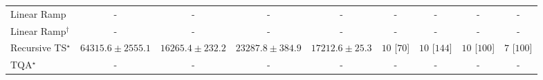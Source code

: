\begin{tabular}{l|cccc|cccc|}
Linear Ramp & {\cellcolor[HTML]{000000}} \color[HTML]{F1F1F1} {\cellcolor{white}} \color{black} - & {\cellcolor[HTML]{000000}} \color[HTML]{F1F1F1} {\cellcolor{white}} \color{black} - & {\cellcolor[HTML]{000000}} \color[HTML]{F1F1F1} {\cellcolor{white}} \color{black} - & {\cellcolor[HTML]{000000}} \color[HTML]{F1F1F1} {\cellcolor{white}} \color{black} - & {\cellcolor[HTML]{000000}} \color[HTML]{F1F1F1} {\cellcolor{white}} \color{black} - & {\cellcolor[HTML]{000000}} \color[HTML]{F1F1F1} {\cellcolor{white}} \color{black} - & {\cellcolor[HTML]{000000}} \color[HTML]{F1F1F1} {\cellcolor{white}} \color{black} - & {\cellcolor[HTML]{000000}} \color[HTML]{F1F1F1} {\cellcolor{white}} \color{black} - \\
Linear Ramp$^\dagger$ & {\cellcolor[HTML]{000000}} \color[HTML]{F1F1F1} {\cellcolor{white}} \color{black} - & {\cellcolor[HTML]{000000}} \color[HTML]{F1F1F1} {\cellcolor{white}} \color{black} - & {\cellcolor[HTML]{000000}} \color[HTML]{F1F1F1} {\cellcolor{white}} \color{black} - & {\cellcolor[HTML]{000000}} \color[HTML]{F1F1F1} {\cellcolor{white}} \color{black} - & {\cellcolor[HTML]{000000}} \color[HTML]{F1F1F1} {\cellcolor{white}} \color{black} - & {\cellcolor[HTML]{000000}} \color[HTML]{F1F1F1} {\cellcolor{white}} \color{black} - & {\cellcolor[HTML]{000000}} \color[HTML]{F1F1F1} {\cellcolor{white}} \color{black} - & {\cellcolor[HTML]{000000}} \color[HTML]{F1F1F1} {\cellcolor{white}} \color{black} - \\
Recursive TS$^\star$ & {\cellcolor[HTML]{C44802}} \color[HTML]{F1F1F1} $64315.6\pm 2555.1$ & {\cellcolor[HTML]{FFFCD7}} \color[HTML]{000000} $16265.4\pm 232.2$ & {\cellcolor[HTML]{FFF3B4}} \color[HTML]{000000} $23287.8\pm 384.9$ & {\cellcolor[HTML]{FFFBD2}} \color[HTML]{000000} $17212.6\pm 25.3$ & {\cellcolor[HTML]{49006A}} \color[HTML]{F1F1F1} $10$ [$70$] & {\cellcolor[HTML]{49006A}} \color[HTML]{F1F1F1} $10$ [$144$] & {\cellcolor[HTML]{49006A}} \color[HTML]{F1F1F1} $10$ [$100$] & {\cellcolor[HTML]{CD238F}} \color[HTML]{F1F1F1} $7$ [$100$] \\
TQA$^\star$ & {\cellcolor[HTML]{000000}} \color[HTML]{F1F1F1} {\cellcolor{white}} \color{black} - & {\cellcolor[HTML]{000000}} \color[HTML]{F1F1F1} {\cellcolor{white}} \color{black} - & {\cellcolor[HTML]{000000}} \color[HTML]{F1F1F1} {\cellcolor{white}} \color{black} - & {\cellcolor[HTML]{000000}} \color[HTML]{F1F1F1} {\cellcolor{white}} \color{black} - & {\cellcolor[HTML]{000000}} \color[HTML]{F1F1F1} {\cellcolor{white}} \color{black} - & {\cellcolor[HTML]{000000}} \color[HTML]{F1F1F1} {\cellcolor{white}} \color{black} - & {\cellcolor[HTML]{000000}} \color[HTML]{F1F1F1} {\cellcolor{white}} \color{black} - & {\cellcolor[HTML]{000000}} \color[HTML]{F1F1F1} {\cellcolor{white}} \color{black} - \\

\end{tabular}
